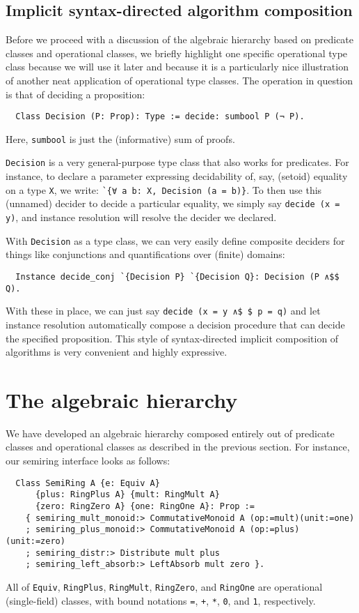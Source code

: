 \documentclass[a4paper,10pt,runningheads]{llncs}
\begin{document}
\subsection{Implicit syntax-directed algorithm composition}

Before we proceed with a discussion of the algebraic hierarchy based on predicate classes and operational classes, we briefly highlight one specific operational type class because we will use it later and because it is a particularly nice illustration of another neat application of operational type classes. The operation in question is that of deciding a proposition:
\begin{lstlisting}
  Class Decision (P: Prop): Type := decide: sumbool P (¬ P).
\end{lstlisting}
Here, \lstinline|sumbool| is just the (informative) sum of proofs.

\lstinline|Decision| is a very general-purpose type class that also works for predicates. For instance, to declare a parameter expressing decidability of, say, (setoid) equality on a type \lstinline|X|, we write: \lstinline|`{∀ a b: X, Decision (a = b)}|. To then use this (unnamed) decider to decide a particular equality, we simply say \lstinline|decide (x = y)|, and instance resolution will resolve the decider we declared.

With \lstinline|Decision| as a type class, we can very easily define composite deciders for things like conjunctions and quantifications over (finite) domains:
\begin{lstlisting}
  Instance decide_conj `{Decision P} `{Decision Q}: Decision (P ∧$$ Q).
\end{lstlisting}
With these in place, we can just say \lstinline|decide (x = y ∧$ $ p = q)| and let instance resolution automatically compose a decision procedure that can decide the specified proposition. This style of syntax-directed implicit composition of algorithms is very convenient and highly expressive.

\section{The algebraic hierarchy}\label{classes}

We have developed an algebraic hierarchy composed entirely out of predicate classes and operational classes as described in the previous section. For instance, our semiring interface looks as follows:
\begin{lstlisting}
  Class SemiRing A {e: Equiv A}
      {plus: RingPlus A} {mult: RingMult A}
      {zero: RingZero A} {one: RingOne A}: Prop :=
    { semiring_mult_monoid:> CommutativeMonoid A (op:=mult)(unit:=one)
    ; semiring_plus_monoid:> CommutativeMonoid A (op:=plus)(unit:=zero)
    ; semiring_distr:> Distribute mult plus
    ; semiring_left_absorb:> LeftAbsorb mult zero }.
\end{lstlisting}
All of \lstinline|Equiv|, \lstinline|RingPlus|, \lstinline|RingMult|, \lstinline|RingZero|, and \lstinline|RingOne| are operational (single-field) classes, with bound notations \lstinline|=|, \lstinline|+|, \lstinline|*|, \lstinline|0|, and \lstinline|1|, respectively.
\end{document}
